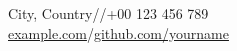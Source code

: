 {\Huge\bfseries\yourname}\par
\vspace{3pt}{\large\color{accent}\yourrole}\par
\vspace{5pt}
{\small City, Country\quad /\quad\href{mailto:\youremail}{\youremail}\quad /\quad +00 123 456 789\\
\href{https://example.com}{example.com}\quad /\quad\href{https://github.com/yourname}{github.com/yourname}}
